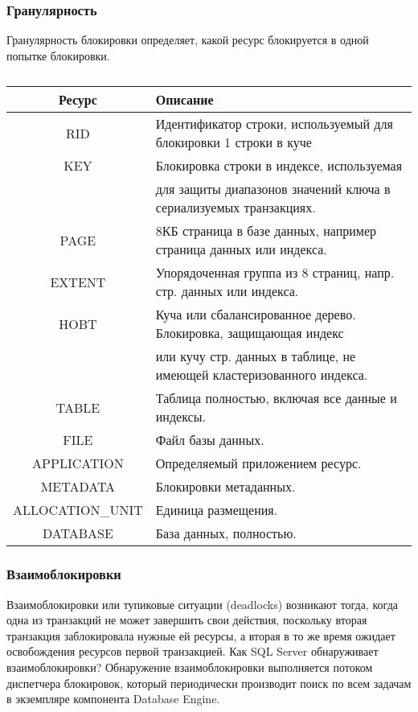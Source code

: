 \subsubsection{Гранулярность}

Гранулярность блокировки определяет, какой ресурс блокируется в одной попытке блокировки.

\begin{table}[ht!]
	\begin{center}
		\caption{}
		\label{tbl:gran}
		\begin{tabular}{|c|l|}
			\hline
			\textbf{Ресурс} & \textbf{Описание} \\
			\hline
			RID & Идентификатор строки, используемый для блокировки 1 строки в куче \\
			\hline
			KEY & Блокировка строки в индексе, используемая \\ & для защиты диапазонов значений ключа в
			сериализуемых транзакциях. \\
			\hline
			PAGE & 8КБ страница в базе данных, например страница данных или индекса. \\
			\hline
			EXTENT & Упорядоченная группа из 8 страниц, напр. стр. данных или индекса. \\
			\hline
			HOBT & Куча или сбалансированное дерево. Блокировка, защищающая индекс \\ & или кучу стр.
			данных в таблице, не имеющей кластеризованного индекса. \\
			\hline
			TABLE & Таблица полностью, включая все данные и индексы. \\
			\hline
			FILE & Файл базы данных. \\
			\hline
			APPLICATION & Определяемый приложением ресурс. \\
			\hline
			METADATA & Блокировки метаданных. \\
			\hline
			ALLOCATION\_UNIT & Единица размещения. \\
			\hline
			DATABASE & База данных, полностью. \\
			\hline
		\end{tabular}
	\end{center}
\end{table}
\FloatBarrier

\subsubsection{Взаимоблокировки}

Взаимоблокировки или тупиковые ситуации (deadlocks) возникают тогда, когда одна из транзакций не может завершить свои действия, поскольку вторая транзакция заблокировала нужные ей ресурсы, а вторая в то же время ожидает освобождения ресурсов первой транзакцией. Как SQL Server обнаруживает взаимоблокировки? Обнаружение взаимоблокировки выполняется потоком диспетчера блокировок, который периодически производит поиск по всем задачам в экземпляре компонента Database Engine.


